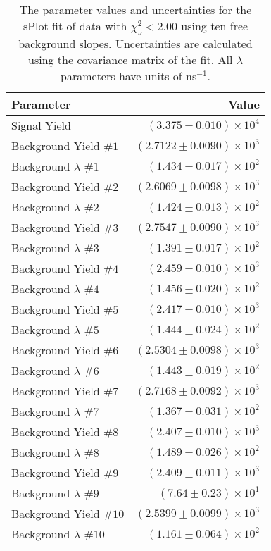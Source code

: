 
\begin{table}[ht]
    \begin{center}
        \begin{tabular}{lr}\toprule
            Parameter & Value \\\midrule
            Signal Yield & $(3.375 \pm 0.010) \times 10^{4}$ \\
            Background Yield $\#1$ & $(2.7122 \pm 0.0090) \times 10^{3}$ \\
            Background $\lambda$ $\#1$ & $(1.434 \pm 0.017) \times 10^{2}$ \\
            Background Yield $\#2$ & $(2.6069 \pm 0.0098) \times 10^{3}$ \\
            Background $\lambda$ $\#2$ & $(1.424 \pm 0.013) \times 10^{2}$ \\
            Background Yield $\#3$ & $(2.7547 \pm 0.0090) \times 10^{3}$ \\
            Background $\lambda$ $\#3$ & $(1.391 \pm 0.017) \times 10^{2}$ \\
            Background Yield $\#4$ & $(2.459 \pm 0.010) \times 10^{3}$ \\
            Background $\lambda$ $\#4$ & $(1.456 \pm 0.020) \times 10^{2}$ \\
            Background Yield $\#5$ & $(2.417 \pm 0.010) \times 10^{3}$ \\
            Background $\lambda$ $\#5$ & $(1.444 \pm 0.024) \times 10^{2}$ \\
            Background Yield $\#6$ & $(2.5304 \pm 0.0098) \times 10^{3}$ \\
            Background $\lambda$ $\#6$ & $(1.443 \pm 0.019) \times 10^{2}$ \\
            Background Yield $\#7$ & $(2.7168 \pm 0.0092) \times 10^{3}$ \\
            Background $\lambda$ $\#7$ & $(1.367 \pm 0.031) \times 10^{2}$ \\
            Background Yield $\#8$ & $(2.407 \pm 0.010) \times 10^{3}$ \\
            Background $\lambda$ $\#8$ & $(1.489 \pm 0.026) \times 10^{2}$ \\
            Background Yield $\#9$ & $(2.409 \pm 0.011) \times 10^{3}$ \\
            Background $\lambda$ $\#9$ & $(7.64 \pm 0.23) \times 10^{1}$ \\
            Background Yield $\#10$ & $(2.5399 \pm 0.0099) \times 10^{3}$ \\
            Background $\lambda$ $\#10$ & $(1.161 \pm 0.064) \times 10^{2}$ \\\bottomrule
        \end{tabular}
        \caption{The parameter values and uncertainties for the sPlot fit of data with $\chi^2_\nu < 2.00$ using ten free background slopes. Uncertainties are calculated using the covariance matrix of the fit. All $\lambda$ parameters have units of $\si{\nano\second}^{-1}$.}\label{tab:splot-fit-results-chisqdof-2.00-free-10}
    \end{center}
\end{table}
